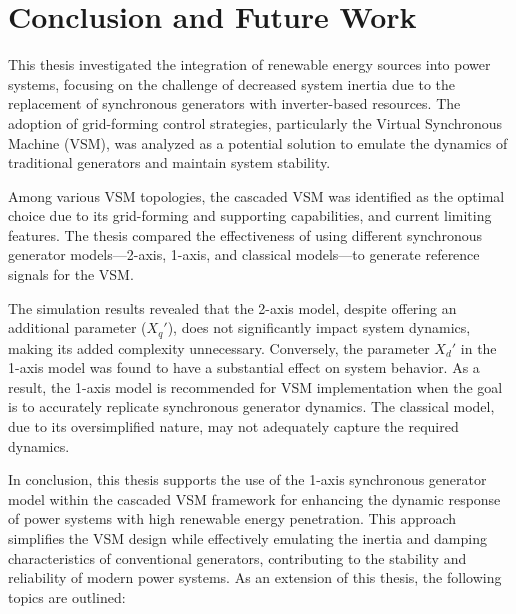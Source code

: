 \chapter{Conclusion and Future Work}
This thesis investigated the integration of renewable energy sources into power
systems, focusing on the challenge of decreased system inertia due to the
replacement of synchronous generators with inverter-based resources. The
adoption of grid-forming control strategies, particularly the Virtual
Synchronous Machine (VSM), was analyzed as a potential solution to emulate the
dynamics of traditional generators and maintain system stability.

Among various VSM topologies, the cascaded VSM was identified as the optimal
choice due to its grid-forming and supporting capabilities, and current
limiting features. The thesis compared the effectiveness of using different
synchronous generator models—2-axis, 1-axis, and classical models—to generate
reference signals for the VSM.

The simulation results revealed that the 2-axis model, despite offering an
additional parameter ($X_q'$), does not significantly impact system dynamics,
making its added complexity unnecessary. Conversely, the parameter $X_d'$ in the
1-axis model was found to have a substantial effect on system behavior. As a
result, the 1-axis model is recommended for VSM implementation when the goal is
to accurately replicate synchronous generator dynamics. The classical model, due
to its oversimplified nature, may not adequately capture the required dynamics.

In conclusion, this thesis supports the use of the 1-axis synchronous generator
model within the cascaded VSM framework for enhancing the dynamic response of
power systems with high renewable energy penetration. This approach simplifies
the VSM design while effectively emulating the inertia and damping
characteristics of conventional generators, contributing to the stability and
reliability of modern power systems. As an extension of this thesis, the
following topics are outlined:

